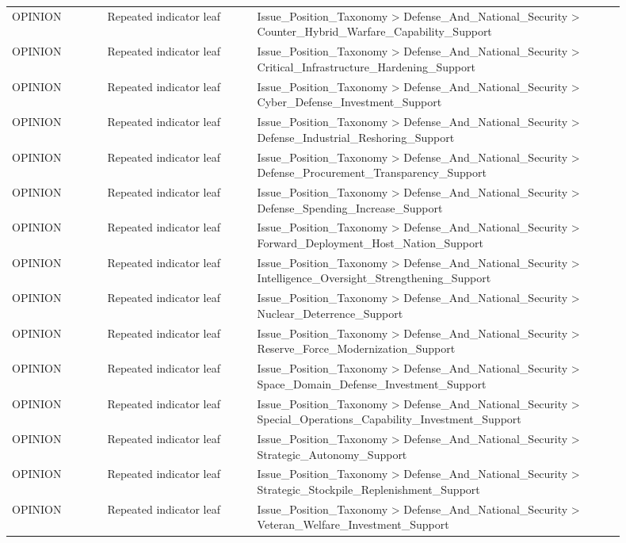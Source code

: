 \begin{table}[htbp]
\begin{threeparttable}
\begin{tabular}{p{0.14\linewidth}p{0.22\linewidth}p{0.54\linewidth}}
OPINION & Repeated indicator leaf & Issue\_Position\_Taxonomy > Defense\_And\_National\_Security > Counter\_Hybrid\_Warfare\_Capability\_Support \\
OPINION & Repeated indicator leaf & Issue\_Position\_Taxonomy > Defense\_And\_National\_Security > Critical\_Infrastructure\_Hardening\_Support \\
OPINION & Repeated indicator leaf & Issue\_Position\_Taxonomy > Defense\_And\_National\_Security > Cyber\_Defense\_Investment\_Support \\
OPINION & Repeated indicator leaf & Issue\_Position\_Taxonomy > Defense\_And\_National\_Security > Defense\_Industrial\_Reshoring\_Support \\
OPINION & Repeated indicator leaf & Issue\_Position\_Taxonomy > Defense\_And\_National\_Security > Defense\_Procurement\_Transparency\_Support \\
OPINION & Repeated indicator leaf & Issue\_Position\_Taxonomy > Defense\_And\_National\_Security > Defense\_Spending\_Increase\_Support \\
OPINION & Repeated indicator leaf & Issue\_Position\_Taxonomy > Defense\_And\_National\_Security > Forward\_Deployment\_Host\_Nation\_Support \\
OPINION & Repeated indicator leaf & Issue\_Position\_Taxonomy > Defense\_And\_National\_Security > Intelligence\_Oversight\_Strengthening\_Support \\
OPINION & Repeated indicator leaf & Issue\_Position\_Taxonomy > Defense\_And\_National\_Security > Nuclear\_Deterrence\_Support \\
OPINION & Repeated indicator leaf & Issue\_Position\_Taxonomy > Defense\_And\_National\_Security > Reserve\_Force\_Modernization\_Support \\
OPINION & Repeated indicator leaf & Issue\_Position\_Taxonomy > Defense\_And\_National\_Security > Space\_Domain\_Defense\_Investment\_Support \\
OPINION & Repeated indicator leaf & Issue\_Position\_Taxonomy > Defense\_And\_National\_Security > Special\_Operations\_Capability\_Investment\_Support \\
OPINION & Repeated indicator leaf & Issue\_Position\_Taxonomy > Defense\_And\_National\_Security > Strategic\_Autonomy\_Support \\
OPINION & Repeated indicator leaf & Issue\_Position\_Taxonomy > Defense\_And\_National\_Security > Strategic\_Stockpile\_Replenishment\_Support \\
OPINION & Repeated indicator leaf & Issue\_Position\_Taxonomy > Defense\_And\_National\_Security > Veteran\_Welfare\_Investment\_Support \\

\end{tabular}
\end{threeparttable}
\end{table}

